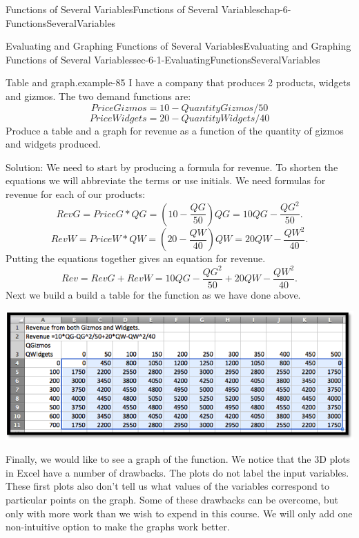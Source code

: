 \documentclass[oneside,10pt,]{book}
\numberwithin{equation}{section}
\begin{document}
\begin{chapterptx}{Functions of Several Variables}{}{Functions of Several Variables}{}{}{chap-6-FunctionsSeveralVariables}
\begin{sectionptx}{Evaluating and Graphing Functions of Several Variables}{}{Evaluating and Graphing Functions of Several Variables}{}{}{sec-6-1-EvaluatingFunctionsSeveralVariables}
\begin{example}{Table and graph.}{example-85}
\hypertarget{p-2134}{}%
I have a company that produces 2 products, widgets and gizmos.  The two demand functions are:%
%
\begin{equation*}
PriceGizmos=10-QuantityGizmos/50
\end{equation*}
%
\begin{equation*}
PriceWidgets=20-QuantityWidgets/40
\end{equation*}
\hypertarget{p-2135}{}%
Produce a table and a graph for revenue as a function of the quantity of gizmos and widgets produced.%
\par
\hypertarget{p-2136}{}%
Solution:  We need to start by producing a formula for revenue.  To shorten the equations we will abbreviate the terms or use initials.  We need formulas for revenue for each of our products:%
%
\begin{equation*}
RevG=PriceG*QG=\left(10-\frac{QG}{50}\right)QG=10QG-\frac{QG^2}{50}.
\end{equation*}
%
\begin{equation*}
RevW=PriceW*QW=\left(20-\frac{QW}{40}\right)QW=20QW-\frac{QW^2}{40}.
\end{equation*}
\hypertarget{p-2137}{}%
Putting the equations together gives an equation for revenue.%
%
\begin{equation*}
Rev=RevG+RevW=10QG-\frac{QG^2}{50}+20QW-\frac{QW^2}{40}.
\end{equation*}
\hypertarget{p-2138}{}%
Next we build a build a table for the function as we have done above.%
\begin{sidebyside}{1}{0.1}{0.1}{0}%
\begin{sbspanel}{0.8}%
\includegraphics[width=1\linewidth]{images/sec-6-1-9.png}
\end{sbspanel}%
\end{sidebyside}%
\par
\hypertarget{p-2139}{}%
Finally, we would like to see a graph of the function.  We notice that the 3D plots in Excel have a number of drawbacks.  The plots do not label the input variables.  These first plots also don’t tell us what values of the variables correspond to particular points on the graph.  Some of these drawbacks can be overcome, but only with more work than we wish to expend in this course.  We will only add one non-intuitive option to make the graphs work better.%

\end{example}
\end{sectionptx}
\end{chapterptx}
\end{document}
